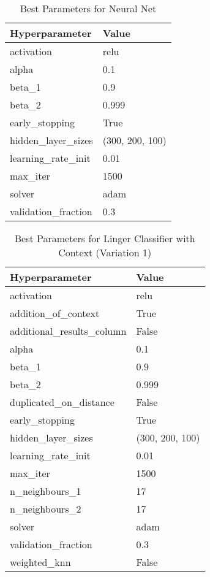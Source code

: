 \documentclass[a4paper, 12pt]{report}
\begin{document}
\begin{table}[H]
    \centering
    \caption{Best Parameters for Neural Net}
    \label{tab:best_parameters_neural_net_LCV1_Glass}
    \begin{tabular}{|l|l|}
    \hline
    \textbf{Hyperparameter} & \textbf{Value} \\ \hline
    activation & relu \\ \hline
    alpha & 0.1 \\ \hline
    beta\_1 & 0.9 \\ \hline
    beta\_2 & 0.999 \\ \hline
    early\_stopping & True \\ \hline
    hidden\_layer\_sizes & (300, 200, 100) \\ \hline
    learning\_rate\_init & 0.01 \\ \hline
    max\_iter & 1500 \\ \hline
    solver & adam \\ \hline
    validation\_fraction & 0.3 \\ \hline
    \end{tabular}
\end{table}

\begin{table}[H]
    \centering
    \caption{Best Parameters for Linger Classifier with Context (Variation 1)}
    \label{tab:best_parameters_linger_classifier_LCV1_Glass}
    \begin{tabular}{|l|l|}
    \hline
    \textbf{Hyperparameter} & \textbf{Value} \\ \hline
    activation & relu \\ \hline
    addition\_of\_context & True \\ \hline
    additional\_results\_column & False \\ \hline
    alpha & 0.1 \\ \hline
    beta\_1 & 0.9 \\ \hline
    beta\_2 & 0.999 \\ \hline
    duplicated\_on\_distance & False \\ \hline
    early\_stopping & True \\ \hline
    hidden\_layer\_sizes & (300, 200, 100) \\ \hline
    learning\_rate\_init & 0.01 \\ \hline
    max\_iter & 1500 \\ \hline
    n\_neighbours\_1 & 17 \\ \hline
    n\_neighbours\_2 & 17 \\ \hline
    solver & adam \\ \hline
    validation\_fraction & 0.3 \\ \hline
    weighted\_knn & False \\ \hline
    \end{tabular}
\end{table}
\end{document}
